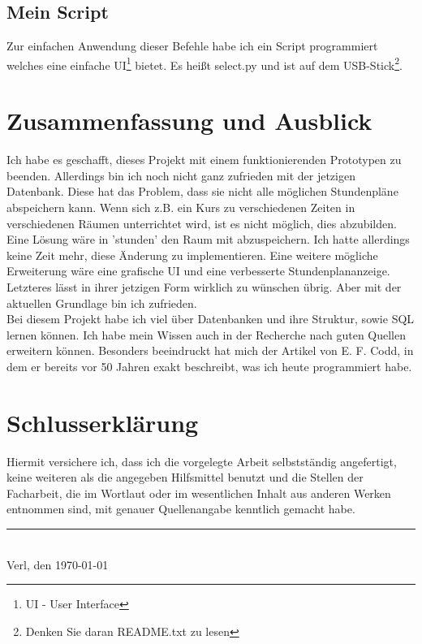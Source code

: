\documentclass[a4paper, 12pt]{article}
\theoremstyle{plain}
\theoremstyle{definition}
\begin{document}
	\subsection{Mein Script}
	Zur einfachen Anwendung dieser Befehle habe ich ein Script programmiert welches eine einfache UI\footnote{UI - User Interface} bietet. Es heißt select.py und ist auf dem USB-Stick\footnote{Denken Sie daran README.txt zu lesen}.
	\section{Zusammenfassung und Ausblick}
	\label{sec:end}
	Ich habe es geschafft, dieses Projekt mit einem funktionierenden Prototypen zu beenden. Allerdings bin ich noch nicht ganz zufrieden mit der jetzigen Datenbank. Diese hat das Problem, dass sie nicht alle möglichen Stundenpläne abspeichern kann. Wenn sich z.B. ein Kurs zu verschiedenen Zeiten in verschiedenen Räumen unterrichtet wird, ist es nicht möglich, dies abzubilden. Eine Lösung wäre in 'stunden' den Raum mit abzuspeichern. Ich hatte allerdings keine Zeit mehr, diese Änderung zu implementieren. Eine weitere mögliche Erweiterung wäre eine grafische UI und eine verbesserte Stundenplananzeige. Letzteres lässt in ihrer jetzigen Form wirklich zu wünschen übrig. Aber mit der aktuellen Grundlage bin ich zufrieden. \\
	Bei diesem Projekt habe ich viel über Datenbanken und ihre Struktur, sowie SQL lernen können. Ich habe mein Wissen auch in der Recherche nach guten Quellen erweitern können. Besonders beeindruckt hat mich der Artikel von E. F. Codd, in dem er bereits vor 50 Jahren exakt beschreibt, was ich heute programmiert habe.
	
	\newpage
	\printbibliography[heading=bibintoc,title={Literaturverzeichnis}]
	\appendix
	\newpage
	
	\section*{Schlusserklärung}
	\label{sec:final}
	Hiermit versichere ich, dass ich die vorgelegte Arbeit selbstständig angefertigt, keine weiteren als die angegeben	 Hilfsmittel benutzt und die Stellen der Facharbeit, die im Wortlaut oder im wesentlichen Inhalt aus anderen Werken entnommen sind, mit genauer Quellenangabe kenntlich gemacht habe.\\[1cm]
	
	\par\noindent\rule{8cm}{0.4pt}\\
	Verl, den \today\\
\end{document}
